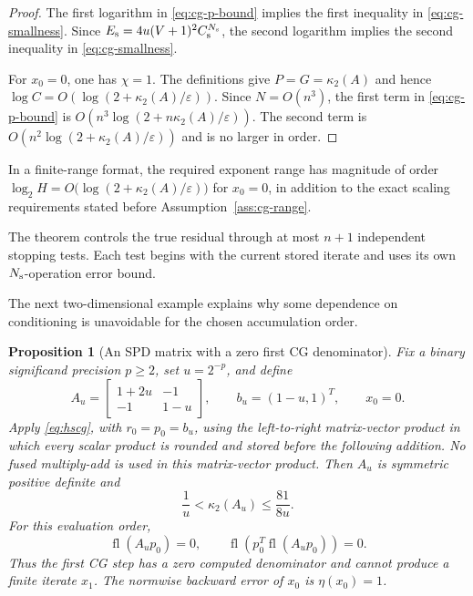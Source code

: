\documentclass[11pt]{article}
\newtheorem{proposition}{Proposition}
\theoremstyle{definition}
\newcommand{\fl}{\operatorname{fl}}
\begin{document}
\begin{proof}
The first logarithm in \eqref{eq:cg-p-bound} implies the first inequality in
\eqref{eq:cg-smallness}.  Since
$E_{\rm s}=4u(V+1)^2C_{\rm s}^{N_{\rm s}}$, the second logarithm implies the
second inequality in \eqref{eq:cg-smallness}.

For $x_0=0$, one has $\chi=1$.  The definitions give
$P=G=\kappa_2(A)$ and hence
$\log C=O(\log(2+\kappa_2(A)/\varepsilon))$.  Since $N=O(n^3)$, the first term
in \eqref{eq:cg-p-bound} is
$O(n^3\log(2+n\kappa_2(A)/\varepsilon))$.  The second term is
$O(n^2\log(2+\kappa_2(A)/\varepsilon))$ and is no larger in order.
\end{proof}

In a finite-range format, the required exponent range has magnitude of order
$\log_2 H=O\bigl(\log(2+\kappa_2(A)/\varepsilon)\bigr)$ for $x_0=0$, in addition
to the exact scaling requirements stated before Assumption~\ref{ass:cg-range}.

The theorem controls the true residual through at most $n+1$ independent
stopping tests.  Each test begins with the current stored iterate and
uses its own $N_{\rm s}$-operation error bound.

The next two-dimensional example explains why some dependence on conditioning
is unavoidable for the chosen accumulation order.

\begin{proposition}[An SPD matrix with a zero first CG denominator]
\label{prop:cg-curvature-loss}
Fix a binary significand precision $p\ge2$, set $u=2^{-p}$, and define
\[
 A_u=\begin{bmatrix}1+2u&-1\\-1&1-u\end{bmatrix},
 \qquad b_u=(1-u,1)^T,\qquad x_0=0.
\]
Apply \eqref{eq:hscg}, with $r_0=p_0=b_u$, using the left-to-right
matrix-vector product in which every scalar product is rounded and stored
before the following addition.  No fused multiply-add is used in this
matrix-vector product.  Then $A_u$ is symmetric
positive definite and
\begin{equation}
 \frac1u<\kappa_2(A_u)\le\frac{81}{8u}.
 \label{eq:cg-curvature-kappa}
\end{equation}
For this evaluation order,
\[
 \fl(A_up_0)=0,
 \qquad
 \fl\!\left(p_0^T\fl(A_up_0)\right)=0.
\]
Thus the first CG step has a zero computed denominator and cannot
produce a finite iterate $x_1$.  The normwise backward error of $x_0$ is
$\eta(x_0)=1$.
\end{proposition}
\end{document}
